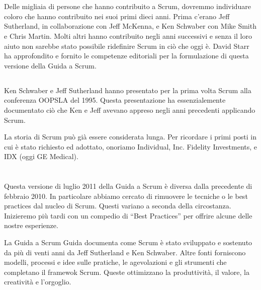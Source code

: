 \newpage
\section*{\color{Blue}{Ringraziamenti}}
\label{sec:acknowledgements}

\subsection*{\color{SteelBlue}{Persone}}
\label{sec:people}
Delle migliaia di persone che hanno contribuito a Scrum, dovremmo individuare coloro che hanno contribuito nei suoi
primi dieci anni. Prima c'erano Jeff Sutherland, in collaborazione con Jeff McKenna, e Ken Schwaber con Mike Smith e
Chris Martin. Molti altri hanno contribuito negli anni successivi e senza il loro aiuto non sarebbe stato possibile ridefinire Scrum in ci\`o che oggi \`e. David Starr ha approfondito e fornito le competenze editoriali per la formulazione di questa versione della Guida a Scrum.

\subsection*{\color{SteelBlue}{Storia}}
\label{sec:history}
Ken Schwaber e Jeff Sutherland hanno presentato per la prima volta Scrum alla conferenza OOPSLA del 1995. Questa presentazione ha essenzialemente documentato ci\`o che Ken e Jeff avevano appreso negli anni precedenti applicando Scrum.

La storia di Scrum pu\`o gi\`a essere considerata lunga. Per ricordare i primi posti in cui \`e stato richiesto ed adottato, onoriamo Individual, Inc. Fidelity Investments, e IDX (oggi GE Medical).

\newpage
\section*{\color{Blue}{Revisioni}}
\label{sec:revisions}
Questa versione di luglio 2011 della Guida a Scrum è diversa dalla precedente di febbraio 2010. In particolare abbiamo cercato di rimuovere le tecniche o le best practices dal nucleo di Scrum. Questi variano a seconda della circostanza. Inizieremo pi\`u tardi con un compedio di ``Best Practices'' per offrire alcune delle nostre esperienze.

La Guida a Scrum Guida documenta come Scrum \`e stato sviluppato e sostenuto da pi\`u di venti anni da Jeff Sutherland e Ken Schwaber. Altre fonti forniscono modelli, processi e idee sulle pratiche, le agevolazioni e gli strumenti che completano il framewok Scrum. Queste ottimizzano la produttività, il valore, la creatività e l'orgoglio.

